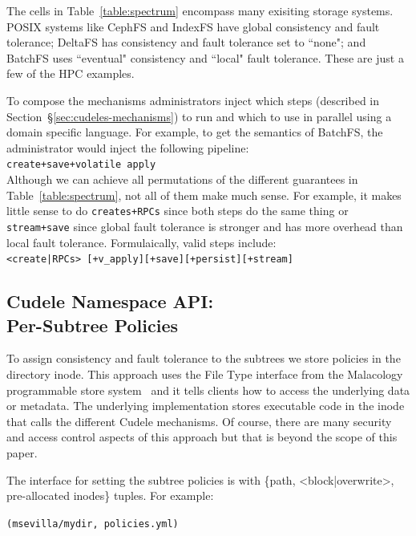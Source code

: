 The cells in Table~\ref{table:spectrum} encompass many exisiting storage
systems. POSIX systems like CephFS and IndexFS have global consistency and
fault tolerance; DeltaFS has consistency and fault tolerance set to ``none";
and BatchFS uses ``eventual" consistency and ``local" fault tolerance. These
are just a few of the HPC examples.  

To compose the mechanisms administrators inject which steps (described in
Section~\S\ref{sec:cudeles-mechanisms}) to run and which to use in parallel
using a domain specific language. For example, to get the semantics of BatchFS,
the administrator would inject the following pipeline:\\

\noindent \texttt{create+save+volatile apply}\\

Although we can achieve all permutations of the different guarantees in
Table~\ref{table:spectrum}, not all of them make much sense. For example, it
makes little sense to do \texttt{creates+RPCs} since both steps do the same
thing or \texttt{stream+save} since global fault tolerance is stronger and has
more overhead than local fault tolerance.  Formulaically, valid steps
include:\\

\noindent \texttt{<create|RPCs> [+v\_apply][+save][+persist][+stream]}

\subsection{Cudele Namespace API:\\Per-Subtree Policies}

To assign consistency and fault tolerance to the subtrees we store policies in
the directory inode. This approach uses the File Type interface from the
Malacology programmable store system~\cite{} and it tells clients how to access
the underlying data or metadata. The underlying implementation stores
executable code in the inode that calls the different Cudele mechanisms. Of
course, there are many security and access control aspects of this approach but
that is beyond the scope of this paper.

The interface for setting the subtree policies is with \{path,
<block|overwrite>, pre-allocated inodes\} tuples. For example:

\texttt{(msevilla/mydir, policies.yml)}

